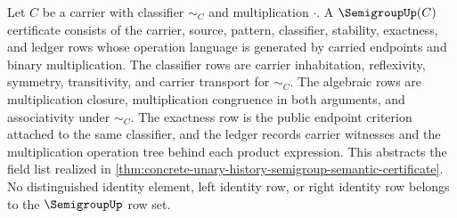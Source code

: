 \begin{definition}
\label{def:semigroup-certificate-fields}
Let $C$ be a carrier with classifier $\sim_C$ and multiplication $\cdot$. A $\SemigroupUp(C)$ certificate consists of the carrier, source, pattern, classifier, stability, exactness, and ledger rows whose operation language is generated by carried endpoints and binary multiplication. The classifier rows are carrier inhabitation, reflexivity, symmetry, transitivity, and carrier transport for $\sim_C$. The algebraic rows are multiplication closure, multiplication congruence in both arguments, and associativity under $\sim_C$. The exactness row is the public endpoint criterion attached to the same classifier, and the ledger records carrier witnesses and the multiplication operation tree behind each product expression. This abstracts the field list realized in \autoref{thm:concrete-unary-history-semigroup-semantic-certificate}. No distinguished identity element, left identity row, or right identity row belongs to the $\SemigroupUp$ row set.
\end{definition}

